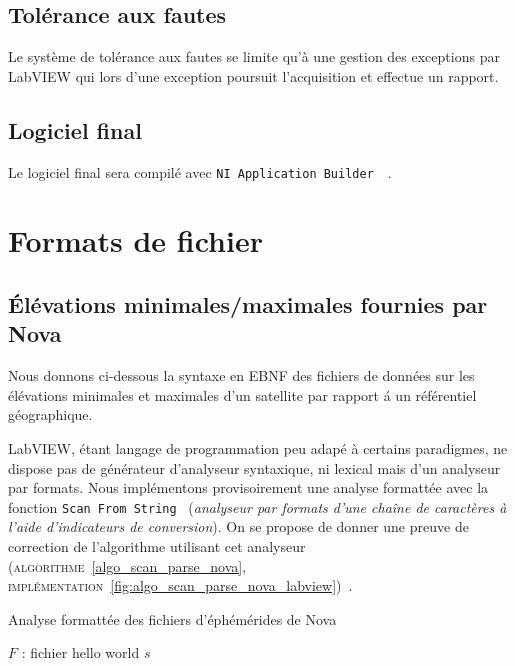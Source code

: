 \documentclass[twocolumn,pre,floats,aps,amsmath,amssymb]{revtex4}
\begin{document}
\subsection{Tol\'erance aux fautes}
Le syst\`eme de tol\'erance aux fautes se limite qu'\`a une gestion des exceptions par LabVIEW qui lors d'une exception poursuit l'acquisition et effectue un rapport.

\subsection{Logiciel final}

Le logiciel final sera compil\'e avec \texttt{NI Application Builder}~\cite{NI_compiler}~\cite{NI_application_builder}.

\section{Formats de fichier}
\label{sec:file_formats}

\subsection{\'El\'evations minimales/maximales fournies par Nova}

Nous donnons ci-dessous la syntaxe en EBNF des fichiers de donn\'ees sur les \'el\'evations minimales et maximales d'un satellite par rapport \'a un r\'ef\'erentiel g\'eographique.

LabVIEW, \'etant langage de programmation peu adap\'e \`a certains paradigmes, ne dispose pas de g\'en\'erateur d'analyseur syntaxique, ni lexical mais d'un analyseur par formats. Nous impl\'ementons provisoirement une analyse formatt\'ee avec la fonction \texttt{Scan From String}~\cite{NI_scan_from_string} (\textit{analyseur par formats d'une cha\^ine de caract\`eres \`a l'aide d'indicateurs de conversion}). On se propose de donner une preuve de correction de l'algorithme utilisant cet analyseur (\textsc{algorithme}~\ref{algo_scan_parse_nova}, \textsc{impl\'ementation}~\ref{fig:algo_scan_parse_nova_labview})~\cite{Knuth}.

\begin{algorithm}[h]
\caption{Analyse formatt\'ee des fichiers d'\'eph\'em\'erides de Nova}
\label{algo_scan_parse_nova}
\begin{algorithmic}[1]
  \REQUIRE $F$ : fichier
  \STATE hello world
  \RETURN $s$
\end{algorithmic}
\end{algorithm}
\end{document}
